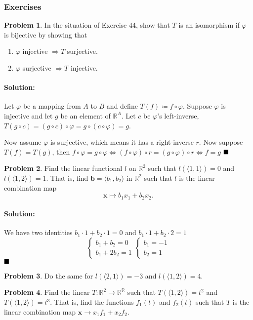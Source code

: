 \documentclass[]{article}
\newcommand{\RR}{\mathbb{R}}
\theoremstyle{definition}
\newtheorem{problem}{Problem}
\newenvironment{solution}{\paragraph{Solution:}}{\hfill$\blacksquare \\$}
\begin{document}
\subsubsection{Exercises}
\begin{problem}
	In the situation of Exercise 44, show that $T$ is an isomorphism if $\varphi$ is bijective by showing that
	\begin{enumerate}
		\item $\varphi$ injective $\Rightarrow T$ surjective.
		\item $\varphi$ surjective $\Rightarrow T$ injective.
	\end{enumerate}
\end{problem}
\begin{solution}
	Let $\varphi$ be a mapping from $A$ to $B$ and define $T(f) \coloneqq f \circ \varphi$. Suppose $\varphi$ is injective and let $g$ be an element of $\RR^A$. Let $c$ be $\varphi$'s left-inverse, $T(g \circ c) = (g \circ c) \circ \varphi = g \circ (c \circ \varphi) = g$. \par
	Now assume $\varphi$ is surjective, which means it has a right-inverse $r$. Now suppose $T(f) = T(g)$, then $f \circ \varphi = g \circ \varphi \Leftrightarrow (f \circ \varphi) \circ r = (g \circ \varphi) \circ r \Leftrightarrow f = g$ 
\end{solution}
\begin{problem}
	Find the linear functional $l$ on $\RR^2$ such that $l(\langle 1, 1 \rangle) = 0$ and $l(\langle 1, 2 \rangle ) = 1$. That is, find $\bm b = \langle b_1, b_2 \rangle$ in $\RR^2$ such that $l$ is the linear combination map 
	\[
		\bm x \mapsto b_1x_1 + b_2x_2.
\]
\end{problem}
\begin{solution}
	We have two identities $b_1 \cdot 1 + b_2 \cdot 1 = 0$ and $b_1 \cdot 1 + b_2 \cdot 2 = 1$ 
	\[
	\begin{cases}
		b_1 + b_2 = 0 \\
		b_1 + 2b_2 = 1
	\end{cases}
	\begin{cases}
		b_1  = -1 \\
		b_2 = 1
	\end{cases}
\]
\end{solution}
\begin{problem}
	Do the same for $l(\langle 2, 1 \rangle) = -3$ and $l(\langle 1, 2 \rangle) = 4$.
\end{problem}
\begin{problem}
	Find the linear $T: \RR^2 \to \RR^\RR$ such that $T(\langle 1, 2 \rangle) = t^2$ and $T(\langle 1, 2 \rangle) = t^3$. That is, find the functions $f_1(t)$ and $f_2(t)$ such that $T$ is the linear combination map $\bm x \to x_1 f_1 + x_2 f_2$.	
\end{problem}
\end{document}
